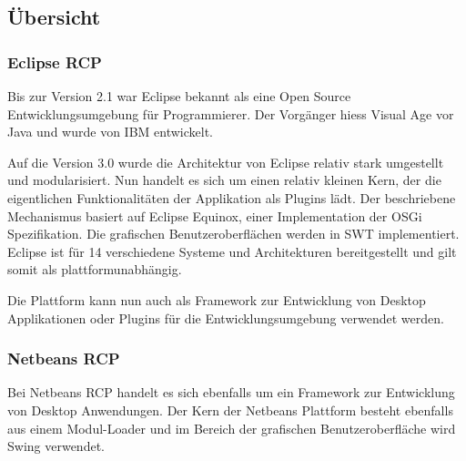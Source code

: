 \subsection{Übersicht}
\subsubsection{Eclipse RCP}
Bis zur Version 2.1 war Eclipse bekannt als eine Open Source Entwicklungsumgebung für Programmierer. Der Vorgänger hiess Visual Age vor Java und wurde von IBM entwickelt. 

Auf die Version 3.0 wurde die Architektur von Eclipse relativ stark umgestellt und modularisiert. Nun handelt es sich um einen relativ kleinen Kern, der die eigentlichen Funktionalitäten der Applikation als Plugins lädt. Der beschriebene Mechanismus basiert auf Eclipse Equinox, einer Implementation der OSGi Spezifikation. Die grafischen Benutzeroberflächen werden in SWT implementiert. Eclipse ist für 14 verschiedene Systeme und Architekturen bereitgestellt und gilt somit als plattformunabhängig\cite{wiki:eclipse}. 

Die Plattform kann nun auch als Framework zur Entwicklung von Desktop Applikationen oder Plugins für die Entwicklungsumgebung  verwendet werden.


\subsubsection{Netbeans RCP}
Bei Netbeans RCP handelt es sich ebenfalls um ein Framework zur Entwicklung von Desktop Anwendungen. Der Kern der Netbeans Plattform besteht ebenfalls aus einem Modul-Loader und im Bereich der grafischen Benutzeroberfläche wird Swing verwendet.

